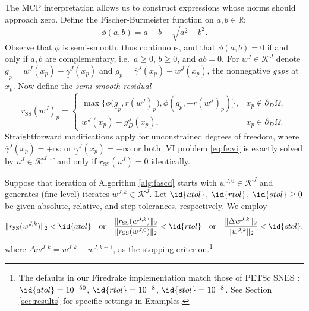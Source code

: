 \documentclass[review,hidelinks,onefignum,onetabnum]{siamart220329}
\newcommand{\RR}{\mathbb{R}}
\newcommand{\cK}{\mathcal{K}}
\newcommand{\rSS}{r_{\text{SS}}}
\begin{document}
The MCP interpretation allows us to construct expressions whose norms should approach zero.  Define the Fischer-Burmeister function \cite{BensonMunson2006,Ulbrich2011} on $a,b\in\RR$:
\begin{equation}
\phi(a,b) = a + b - \sqrt{a^2 + b^2}. \label{eq:phiFB}
\end{equation}
Observe that $\phi$ is semi-smooth, thus continuous, and that $\phi(a,b)=0$ if and only if $a,b$ are complementary, i.e.~$a\ge 0$, $b\ge 0$, and $ab=0$.  For $w^J\in \mathcal{K}^J$ denote $\underline{g}_p = w^J(x_p) - \underline{\gamma}^J(x_p)$ and $\overline{g}_p = \overline{\gamma}^J(x_p) - w^J(x_p)$, the nonnegative \emph{gaps} at $x_p$.  Now define the \emph{semi-smooth residual}
\begin{equation}
\rSS(w^J)_p = \begin{cases}
\max\big\{\phi\big(\underline{g}_p, r(w^J)_p\big), \phi\left(\overline{g}_p, -r(w^J)_p\right)\big\}, & x_p \notin \partial_D\Omega, \\
w^J(x_p) - g_D^J(x_p), & x_p \in \partial_D\Omega.
\end{cases} \label{eq:rSS}
\end{equation}
Straightforward modifications apply for unconstrained degrees of freedom, where $\overline{\gamma}^J(x_p) = +\infty$ or $\underline{\gamma}^J(x_p) = -\infty$ or both.  VI problem \eqref{eq:fe:vi} is exactly solved by $u^J\in\cK^J$ if and only if $\rSS(u^J)=0$ identically.

Suppose that iteration of Algorithm \ref{alg:fascd} starts with $w^{J,0} \in \mathcal{K}^J$ and generates (fine-level) iterates $w^{J,k} \in \mathcal{K}^J$.  Let $\id{atol}$, $\id{rtol}$, $\id{stol} \ge 0$ be given absolute, relative, and step tolerances, respectively.  We employ
\begin{equation}
\|\rSS(w^{J,k})\|_2 < \id{atol} \quad \text{or} \quad \frac{\|\rSS(w^{J,k})\|_2}{\|\rSS(w^{J,0})\|_2} < \id{rtol} \quad \text{or} \quad \frac{\|\Delta w^{J,k}\|_2}{\|w^{J,k}\|_2} < \id{stol}, \label{eq:stoppingcriterion}
\end{equation}
where $\Delta w^{J,k} = w^{J,k} -  w^{J,k-1}$, as the stopping criterion.\footnote{The defaults in our Firedrake implementation match those of PETSc SNES \cite{Balayetal2023}: $\id{atol}=10^{-50}$, $\id{rtol}=10^{-8}$, $\id{stol}=10^{-8}$.  See Section \ref{sec:results} for specific settings in Examples.}
\end{document}
